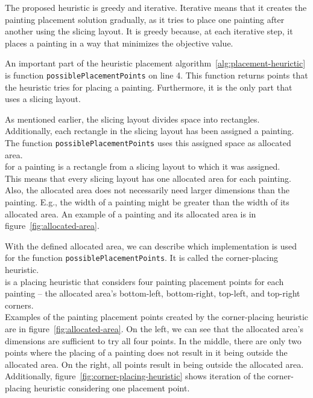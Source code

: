 The proposed heuristic is greedy and iterative.
Iterative means that it creates the painting placement solution gradually, as it
tries to place one painting after another using the slicing layout.
It is greedy because, at each iterative step, it places a painting in a way that minimizes the objective value.

An important part of the heuristic placement algorithm~\ref{alg:placement-heurictic}
is function \verb|possiblePlacementPoints| on line 4.
This function returns points that the heuristic tries for placing a painting.
Furthermore, it is the only part that uses a slicing layout.

As mentioned earlier, the slicing layout divides space into rectangles.
Additionally, each rectangle in the slicing layout has been assigned a painting.
The function \verb|possiblePlacementPoints| uses this assigned space as allocated area.\\

 for a painting is a rectangle from a slicing layout to which it was assigned.\\

This means that every slicing layout has one allocated area for each painting.
Also, the allocated area does not necessarily need larger dimensions than the painting.
E.g., the width of a painting might be greater than the width of its allocated area.
An example of a painting and its allocated area is in figure~\ref{fig:allocated-area}.

With the defined allocated area,
we can describe which implementation is used for the function \verb|possiblePlacementPoints|.
It is called the corner-placing heuristic.\\

 is a placing heuristic that considers four painting placement points for each painting
– the allocated area's bottom-left, bottom-right, top-left, and top-right corners.\\

Examples of the painting placement points created by the corner-placing heuristic are in figure~\ref{fig:allocated-area}.
On the left, we can see that the allocated area's dimensions are sufficient
to try all four points.
In the middle, there are only two points where the placing of a painting does not
result in it being outside the allocated area.
On the right, all points result in being outside the allocated area.
Additionally, figure~\ref {fig:corner-placing-heuristic} shows iteration of the corner-placing heuristic considering one placement point.

